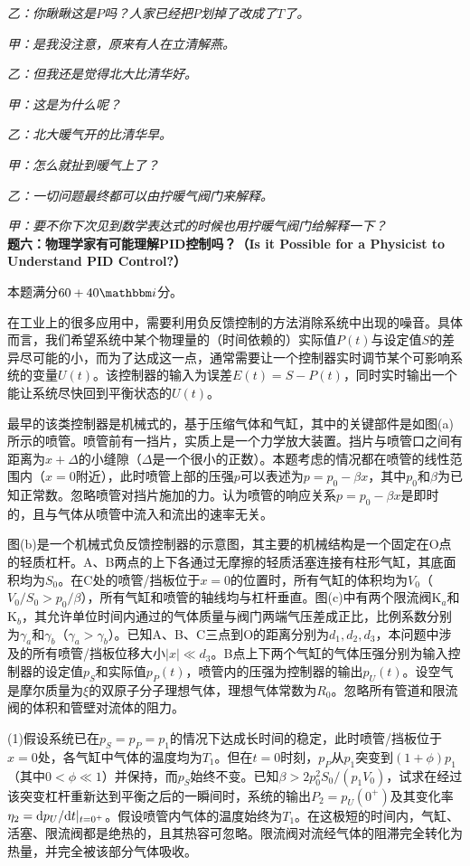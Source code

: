 \documentclass[11pt,a4paper,onecolumn,UTF8]{ctexart}
\begin{document}
	\textit{乙：你瞅瞅这是$P$吗？人家已经把$P$划掉了改成了$T$了。}
	
	\textit{甲：是我没注意，原来有人在立清解燕。}
	
	\textit{乙：但我还是觉得北大比清华好。}
	
	\textit{甲：这是为什么呢？}
	
	\textit{乙：北大暖气开的比清华早。}
	
	\textit{甲：怎么就扯到暖气上了？}
	
	\textit{乙：一切问题最终都可以由拧暖气阀门来解释。}
	
	\textit{甲：要不你下次见到数学表达式的时候也用拧暖气阀门给解释一下？}\\
	
	\noindent
	\textbf{题六：物理学家有可能理解PID控制吗？（Is it Possible for a Physicist to Understand PID Control?）}
	
	本题满分$60+40\ui$分。
	
	在工业上的很多应用中，需要利用负反馈控制的方法消除系统中出现的噪音。具体而言，我们希望系统中某个物理量的（时间依赖的）实际值$P(t)$与设定值$S$的差异尽可能的小，而为了达成这一点，通常需要让一个控制器实时调节某个可影响系统的变量$U(t)$。该控制器的输入为误差$E(t)=S-P(t)$，同时实时输出一个能让系统尽快回到平衡状态的$U(t)$。
	
	最早的该类控制器是机械式的，基于压缩气体和气缸，其中的关键部件是如图(a)所示的喷管。喷管前有一挡片，实质上是一个力学放大装置。挡片与喷管口之间有距离为$x+\Delta$的小缝隙（$\Delta$是一个很小的正数）。本题考虑的情况都在喷管的线性范围内（$x=0$附近），此时喷管上部的压强$p$可以表述为$p=p_0-\beta x$，其中$p_0$和$\beta$为已知正常数。忽略喷管对挡片施加的力。认为喷管的响应关系$p=p_0-\beta x$是即时的，且与气体从喷管中流入和流出的速率无关。
	
	图(b)是一个机械式负反馈控制器的示意图，其主要的机械结构是一个固定在O点的轻质杠杆。A、B两点的上下各通过无摩擦的轻质活塞连接有柱形气缸，其底面积均为$S_0$。在C处的喷管/挡板位于$x=0$的位置时，所有气缸的体积均为$V_0$（$V_0/S_0>p_0/\beta$），所有气缸和喷管的轴线均与杠杆垂直。图(c)中有两个限流阀K$_a$和K$_b$，其允许单位时间内通过的气体质量与阀门两端气压差成正比，比例系数分别为$\gamma_a$和$\gamma_b$（$\gamma_a>\gamma_b$）。已知A、B、C三点到O的距离分别为$d_1,d_2,d_3$，本问题中涉及的所有喷管/挡板位移大小$|x|\ll d_3$。B点上下两个气缸的气体压强分别为输入控制器的设定值$p_S$和实际值$p_P(t)$，喷管内的压强为控制器的输出$p_U(t)$。设空气是摩尔质量为$\xi$的双原子分子理想气体，理想气体常数为$R_0$。忽略所有管道和限流阀的体积和管壁对流体的阻力。
	
	(1)假设系统已在$p_S=p_P=p_1$的情况下达成长时间的稳定，此时喷管/挡板位于$x=0$处，各气缸中气体的温度均为$T_1$。但在$t=0$时刻，$p_P$从$p_1$突变到$(1+\phi)p_1$（其中$0<\phi\ll 1$）并保持，而$p_S$始终不变。已知$\beta>2p_0^2S_0/(p_1V_0)$，试求在经过该突变杠杆重新达到平衡之后的一瞬间时，系统的输出$P_2=p_U(0^+)$及其变化率$\eta_2=\mathrm{d} p_U/\mathrm{d} t|_{t=0^+}$。假设喷管内气体的温度始终为$T_1$。在这极短的时间内，气缸、活塞、限流阀都是绝热的，且其热容可忽略。限流阀对流经气体的阻滞完全转化为热量，并完全被该部分气体吸收。
	
\end{document}
